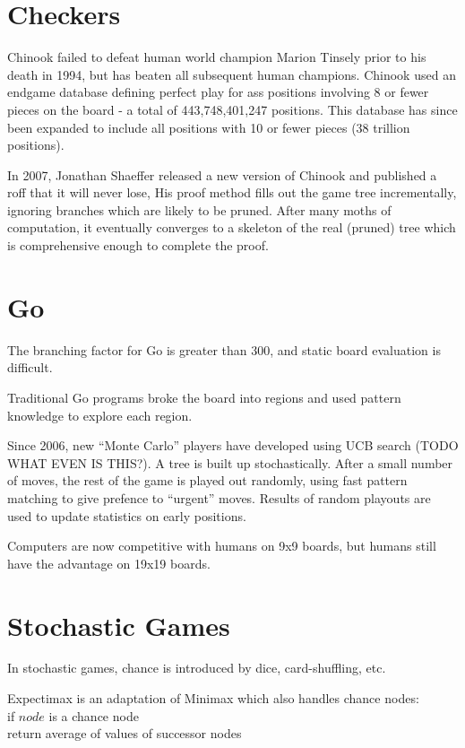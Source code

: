 \section{Checkers}
Chinook failed to defeat human world champion Marion Tinsely prior to his death
in 1994, but has beaten all subsequent human champions. Chinook used an endgame
database defining perfect play for ass positions involving 8 or fewer pieces on
the board - a total of 443,748,401,247 positions. This database has since been
expanded to include all positions with 10 or fewer pieces (38 trillion
positions).

In 2007, Jonathan Shaeffer released a new version of Chinook and published a
roff that it will never lose, His proof method fills out the game tree
incrementally, ignoring branches which are likely to be pruned. After many
moths of computation, it eventually converges to a skeleton of the real
(pruned) tree which is comprehensive enough to complete the proof.

\section{Go}
The branching factor for Go is greater than 300, and static board evaluation is
difficult.

Traditional Go programs broke the board into regions and used pattern knowledge
to explore each region.

Since 2006, new ``Monte Carlo'' players have developed using UCB search (TODO WHAT
EVEN IS THIS?). A tree is built up stochastically. After a small number of
moves, the rest of the game is played out randomly, using fast pattern matching
to give prefence to ``urgent'' moves. Results of random playouts are used to
update statistics on early positions.

Computers are now competitive with humans on 9x9 boards, but humans still have
the advantage on 19x19 boards.

\section{Stochastic Games}
In stochastic games, chance is introduced by dice, card-shuffling, etc.

Expectimax is an adaptation of Minimax which also handles chance nodes:\\
\indent if $node$ is a chance node\\
\indent\indent return average of values of successor nodes

